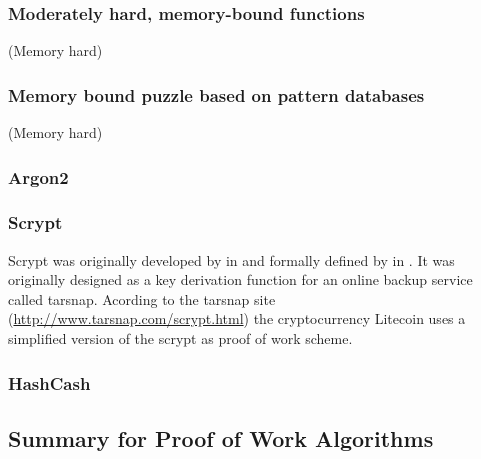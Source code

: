 \subsubsection{Moderately hard, memory-bound functions} 

\cite{abadi2005moderately} (Memory hard)


\subsubsection{Memory bound puzzle based on pattern databases} 

\cite{doshi2006efficient} (Memory hard)


\subsubsection{Argon2}
\cite{biryukov2016argon2}


\subsubsection{Scrypt}
Scrypt was originally developed by \citeauthor{percival2009stronger} in \citeyear{percival2009stronger} and formally defined by \citeauthor{RFC7914} in \cite{RFC7914}. It was originally designed as a key derivation function for an online backup service called tarsnap. Acording to the tarsnap site (\href{http://www.tarsnap.com/scrypt.html}{http://www.tarsnap.com/scrypt.html}) the cryptocurrency Litecoin uses a simplified version of the scrypt as proof of work scheme.

\cite{forler2014memory}


\subsubsection{HashCash}
\cite{back2003hashcash}


\subsection{Summary for Proof of Work Algorithms}

